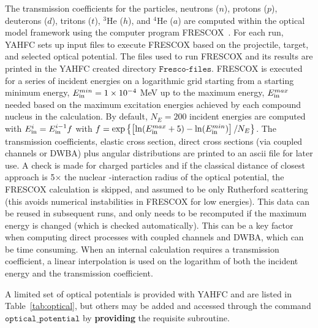 \documentclass[
10pt,
showpacs,preprintnumbers,footinbib,
amsfonts,amsmath,amssymb,
aps,
prc,twocolumn,groupedaddress,superscriptaddress,
showkeys,
nofootinbib
]{revtex4-1}
\begin{document}
The transmission coefficients for the particles, neutrons ($n$), protons ($p$), deuterons ($d$), tritons ($t$), $^3$He ($h$), and $^4$He ($a$) are computed within the optical model framework using the computer program FRESCOX~\cite{FRESCO}. For each run, YAHFC sets up input files to execute FRESCOX based on the projectile, target, and selected optical potential. The files used to run FRESCOX and its results are printed in the YAHFC created directory ${\texttt{Fresco-files}}$. FRESCOX is executed for a series of incident energies on a logarithmic grid starting from a starting minimum energy, $E_{\rm in}^{min} =1\times 10^{-4}$ MeV up to the maximum energy, $E_{\rm in}^{max}$ needed based on the maximum excitation energies achieved by each compound nucleus in the calculation. By default, $N_E=200$ incident energies are computed with $E_{\rm in}^i = E_{\rm in}^{i-1}f$ with 
$ f = \exp \left \{ \left [ \ln(E_{\rm in}^{max} + 5) - \ln(E_{\rm in}^{min}) \right ]/N_E \right \}$. The transmission coefficients, elastic cross section, direct cross sections (via coupled channels or DWBA) plus angular distributions are printed to an ascii file for later use. A check is made for charged particles and if the classical distance of closest approach is 5$\times$ the nuclear -interaction radius of the optical potential, the FRESCOX calculation is skipped, and assumed to be only Rutherford scattering (this avoids numerical instabilities in FRESCOX for low energies).  This data can be reused in subsequent runs, and only needs to be recomputed if the maximum energy is changed (which is checked automatically). This can be a key factor when computing direct processes with coupled channels and DWBA, which can be time consuming. When an internal calculation requires a transmission coefficient, a linear interpolation is used on the logarithm of both the incident energy and the transmission coefficient. 

A limited set of optical potentials is provided with YAHFC and are listed in Table~\ref{tab:optical}, but others may be added and accessed through the command ${\texttt{optical\_potential}}$ by {\bf providing} the requisite subroutine. 
\end{document}
